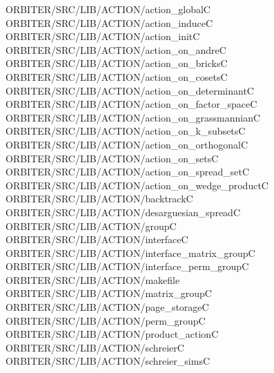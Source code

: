 \begin{tabbing}
ORBITER/SRC/LIB/ACTION/action\_globalC\\[0pt]
ORBITER/SRC/LIB/ACTION/action\_induceC\\[0pt]
ORBITER/SRC/LIB/ACTION/action\_initC\\[0pt]
ORBITER/SRC/LIB/ACTION/action\_on\_andreC\\[0pt]
ORBITER/SRC/LIB/ACTION/action\_on\_bricksC\\[0pt]
ORBITER/SRC/LIB/ACTION/action\_on\_cosetsC\\[0pt]
ORBITER/SRC/LIB/ACTION/action\_on\_determinantC\\[0pt]
ORBITER/SRC/LIB/ACTION/action\_on\_factor\_spaceC\\[0pt]
ORBITER/SRC/LIB/ACTION/action\_on\_grassmannianC\\[0pt]
ORBITER/SRC/LIB/ACTION/action\_on\_k\_subsetsC\\[0pt]
ORBITER/SRC/LIB/ACTION/action\_on\_orthogonalC\\[0pt]
ORBITER/SRC/LIB/ACTION/action\_on\_setsC\\[0pt]
ORBITER/SRC/LIB/ACTION/action\_on\_spread\_setC\\[0pt]
ORBITER/SRC/LIB/ACTION/action\_on\_wedge\_productC\\[0pt]
ORBITER/SRC/LIB/ACTION/backtrackC\\[0pt]
ORBITER/SRC/LIB/ACTION/desarguesian\_spreadC\\[0pt]
ORBITER/SRC/LIB/ACTION/groupC\\[0pt]
ORBITER/SRC/LIB/ACTION/interfaceC\\[0pt]
ORBITER/SRC/LIB/ACTION/interface\_matrix\_groupC\\[0pt]
ORBITER/SRC/LIB/ACTION/interface\_perm\_groupC\\[0pt]
ORBITER/SRC/LIB/ACTION/makefile\\[0pt]
ORBITER/SRC/LIB/ACTION/matrix\_groupC\\[0pt]
ORBITER/SRC/LIB/ACTION/page\_storageC\\[0pt]
ORBITER/SRC/LIB/ACTION/perm\_groupC\\[0pt]
ORBITER/SRC/LIB/ACTION/product\_actionC\\[0pt]
ORBITER/SRC/LIB/ACTION/schreierC\\[0pt]
ORBITER/SRC/LIB/ACTION/schreier\_simsC\\[0pt]

\end{tabbing}
